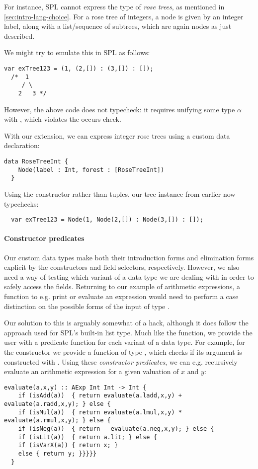 For instance, SPL cannot express the type of \emph{rose trees}, as mentioned
in \cref{sec:intro-lang-choice}. For a rose tree of integers, a node is
given by an integer label, along with a list/sequence of subtrees, which are
again nodes as just described.

We might try to emulate this in SPL as follows:
\begin{lstlisting}[language=SPL]
  var exTree123 = (1, (2,[]) : (3,[]) : []);
  /*  1
     / \
    2   3 */
\end{lstlisting}
%
However, the above code does not typecheck: it requires unifying some type
$\alpha$ with \spl{(Int,[$\alpha$])}, which violates the occurs check.

With our extension, we can express integer rose trees using a custom data declaration:
\begin{lstlisting}[language=SPL]
  data RoseTreeInt {
    Node(label : Int, forest : [RoseTreeInt])
  }
\end{lstlisting}
%
Using the  constructor rather than tuples, our tree instance from
earlier now typechecks:
\begin{lstlisting}
  var exTree123 = Node(1, Node(2,[]) : Node(3,[]) : []);
\end{lstlisting}


\paragraph{Constructor predicates}
Our custom data types make both their introduction forms and elimination forms
explicit by the constructors and field selectors, respectively.
However, we also need a way of testing which variant of a data type we are
dealing with in order to safely access the fields. Returning to our example of
arithmetic expressions, a function to e.g. print or evaluate an expression would
need to perform a case distinction on the possible forms of the input of type
\spl{AExp}.

Our solution to this is arguably somewhat of a hack, although it does follow the
approach used for SPL's built-in list type. Much like the \spl{isEmpty}
function, we provide the user with a predicate function for each variant of a
data type. For example, for the  constructor we provide a function
\spl{isAdd} of type \spl{AExp -> Bool}, which checks if its argument is
constructed with \spl{Add}.
Using these \emph{constructor predicates}, we can e.g. recursively evaluate an
arithmetic expression for a given valuation of $x$ and $y$:
\begin{lstlisting}[language=SPL]
  evaluate(a,x,y) :: AExp Int Int -> Int {
    if (isAdd(a))  { return evaluate(a.ladd,x,y) + evaluate(a.radd,x,y); } else {
    if (isMul(a))  { return evaluate(a.lmul,x,y) * evaluate(a.rmul,x,y); } else {
    if (isNeg(a))  { return - evaluate(a.neg,x,y); } else {
    if (isLit(a))  { return a.lit; } else {
    if (isVarX(a)) { return x; }
    else { return y; }}}}}
  }
\end{lstlisting}

